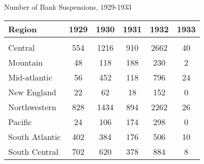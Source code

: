 \documentclass[11pt]{beamer}
\begin{document}
\begin{frame}{Number of Bank Suspensions, 1929-1933}
\begin{table}  \tiny{
\begin{tabular}{lccccc} 
Region & 1929 & 1930 & 1931 & 1932 & 1933\\
\hline \hline \\
Central & \multicolumn{1}{c}{554} & \multicolumn{1}{c}{1216} & \multicolumn{1}{c}{910} & \multicolumn{1}{c}{2662} & \multicolumn{1}{c}{40}\\
 Mountain & \multicolumn{1}{c}{48} & \multicolumn{1}{c}{118} & \multicolumn{1}{c}{188} & \multicolumn{1}{c}{230} & \multicolumn{1}{c}{2}\\
 Mid-atlantic & \multicolumn{1}{c}{56} & \multicolumn{1}{c}{452} & \multicolumn{1}{c}{118} & \multicolumn{1}{c}{796} & \multicolumn{1}{c}{24}\\
 New England & \multicolumn{1}{c}{22} & \multicolumn{1}{c}{62} & \multicolumn{1}{c}{18} & \multicolumn{1}{c}{152} & \multicolumn{1}{c}{0}\\
 Northwestern & \multicolumn{1}{c}{828} & \multicolumn{1}{c}{1434} & \multicolumn{1}{c}{894} & \multicolumn{1}{c}{2262} & \multicolumn{1}{c}{26}\\
 Pacific & \multicolumn{1}{c}{24} & \multicolumn{1}{c}{106} & \multicolumn{1}{c}{174} & \multicolumn{1}{c}{298} & \multicolumn{1}{c}{0}\\
 South Atlantic & \multicolumn{1}{c}{402} & \multicolumn{1}{c}{384} & \multicolumn{1}{c}{176} & \multicolumn{1}{c}{506} & \multicolumn{1}{c}{10}\\
 South Central & \multicolumn{1}{c}{702} & \multicolumn{1}{c}{620} & \multicolumn{1}{c}{378} & \multicolumn{1}{c}{884} & \multicolumn{1}{c}{8}\\
\hline                                                                                                                             

\end{tabular}
}
\end{table}
\end{frame}
\end{document}
